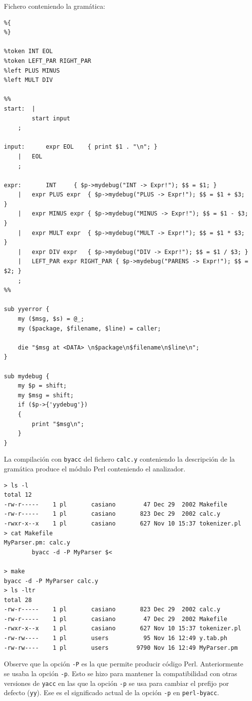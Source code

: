 Fichero conteniendo la gramática:
\begin{verbatim}
%{
%}

%token INT EOL
%token LEFT_PAR RIGHT_PAR
%left PLUS MINUS
%left MULT DIV

%%
start:	|
		start input
	;

input:		expr EOL	{ print $1 . "\n"; }
	|	EOL
	;

expr:		INT		{ $p->mydebug("INT -> Expr!"); $$ = $1; }
	|	expr PLUS expr	{ $p->mydebug("PLUS -> Expr!"); $$ = $1 + $3; }
	|	expr MINUS expr	{ $p->mydebug("MINUS -> Expr!"); $$ = $1 - $3; }
	|	expr MULT expr	{ $p->mydebug("MULT -> Expr!"); $$ = $1 * $3; }
	|	expr DIV expr	{ $p->mydebug("DIV -> Expr!"); $$ = $1 / $3; }
	|	LEFT_PAR expr RIGHT_PAR { $p->mydebug("PARENS -> Expr!"); $$ = $2; }
	;
%%

sub yyerror {
    my ($msg, $s) = @_;
    my ($package, $filename, $line) = caller;
    
    die "$msg at <DATA> \n$package\n$filename\n$line\n";
}

sub mydebug {
    my $p = shift;
    my $msg = shift;
    if ($p->{'yydebug'})
    {
        print "$msg\n";
    }
}
\end{verbatim}
La compilación con \verb|byacc| del fichero \verb|calc.y|
conteniendo la descripción de la gramática produce el módulo 
Perl conteniendo el analizador.
\begin{verbatim}
> ls -l
total 12
-rw-r-----    1 pl       casiano        47 Dec 29  2002 Makefile
-rw-r-----    1 pl       casiano       823 Dec 29  2002 calc.y
-rwxr-x--x    1 pl       casiano       627 Nov 10 15:37 tokenizer.pl
> cat Makefile
MyParser.pm: calc.y
        byacc -d -P MyParser $<

> make
byacc -d -P MyParser calc.y
> ls -ltr
total 28
-rw-r-----    1 pl       casiano       823 Dec 29  2002 calc.y
-rw-r-----    1 pl       casiano        47 Dec 29  2002 Makefile
-rwxr-x--x    1 pl       casiano       627 Nov 10 15:37 tokenizer.pl
-rw-rw----    1 pl       users          95 Nov 16 12:49 y.tab.ph
-rw-rw----    1 pl       users        9790 Nov 16 12:49 MyParser.pm
\end{verbatim}
Observe que la opción \verb|-P| es la que permite producir código Perl.
Anteriormente se usaba la opción \verb|-p|. Esto se hizo para mantener la 
compatibilidad con otras versiones de \verb|yacc| en las que la opción \verb|-p|
se usa para cambiar el prefijo por defecto (\verb|yy|). Ese es el significado actual
de la opción \verb|-p| en \verb|perl-byacc|.


